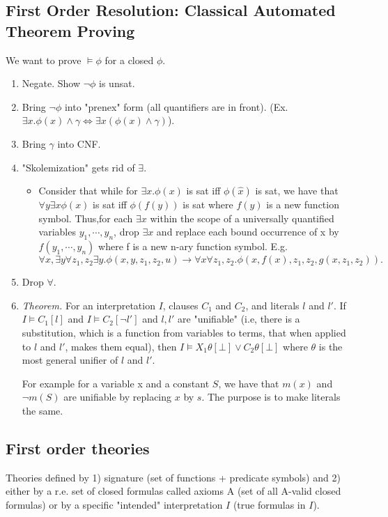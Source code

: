 \subsection{First Order Resolution: Classical Automated Theorem Proving} We want to prove $\models \phi$ for a closed $\phi$.
\begin{enumerate}
    \item Negate. Show $\neg \phi$ is unsat.
    \item Bring $\neg \phi$ into "prenex" form (all quantifiers are in front). (Ex. $\exists x. \phi(x) \land \gamma \iff \exists x (\phi(x) \land \gamma)$).
    \item Bring $\gamma$ into CNF.
    \item "Skolemization" gets rid of $\exists$. 
    \begin{itemize}
        \item Consider that  while for $\exists x.\phi(x)$ is sat iff $\phi(\hat{x})$ is sat, we have that $\forall y \exists x \phi(x)$  is sat iff $\phi(f(y))$ is sat where $f(y)$ is a new function symbol. Thus,for each $\exists x$ within the scope of a universally quantified variables $y_1, \cdots,y_n$, drop $\exists x$ and replace each bound occurrence of x by $f(y_1,\cdots,y_n)$ where f is a new n-ary function symbol. E.g. 
        \begin{equation}
            \forall x, \exists y \forall z_1,z_2 \exists y . \phi (x,y,z_1,z_2, u) \rightarrow \forall x \forall z_1, z_2. \phi (x, f(x), z_1, z_2, g(x, z_1,z_2)).
        \end{equation}
    \end{itemize}
    \item Drop $\forall$.
    \item \textit{Theorem.} For an interpretation $I$, clauses $C_1$ and $C_2$, and literals $l$ and $l'$. If $I \models C_1[l]$ and $I \models C_2[\neg l']$ and $l, l'$ are "unifiable" (i.e, there is a substitution, which is a function from variables to terms, that when applied to $l$ and $l'$, makes them equal), then $I \models X_1\theta [\bot] \lor C_2\theta [\bot]$ where $\theta$ is the most general unifier of $l$  and $l'$.
    
    For example for a variable x and a constant $S$, we have that $m(x)$ and $\neg m(S)$ are unifiable by replacing $x $ by $s$. The purpose is to make literals the same.
\end{enumerate}

\subsection{First order theories} Theories defined by 1) signature (set of functions + predicate symbols) and 2) either by a r.e. set of closed formulas called axioms A (set of all A-valid closed formulas) or by a specific "intended" interpretation $I$ (true formulas in $I$).

